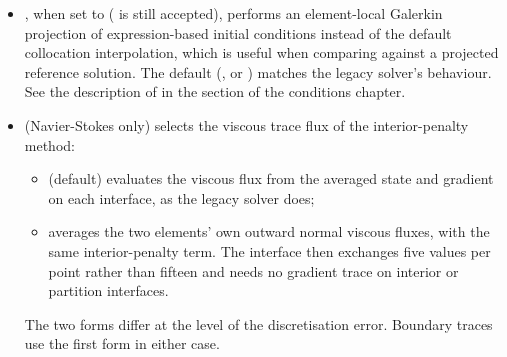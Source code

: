 \begin{itemize}
\begin{lstlisting}[style=XmlStyle]
<OPTIMISATION>
  <OPERATORS>
    <AVXBACKEND>
      <MASS> StdMat </MASS>
    </AVXBACKEND>
  </OPERATORS>
</OPTIMISATION>
\end{lstlisting}
  where ,  and
   sections each list operators by name with their
  implementation. Anything still unspecified defaults to 
  with a warning.
\item {}, when set to 
  ( is still accepted), performs an element-local Galerkin
  projection of expression-based initial conditions instead of the
  default collocation interpolation, which is useful when comparing
  against a projected reference solution. The default (,
  or ) matches the legacy solver's behaviour. See the
  description of  in the
   section of the conditions chapter.
\item {} (Navier-Stokes only) selects the viscous
  trace flux of the interior-penalty method:
  \begin{itemize}
  \item {} (default) evaluates the viscous flux from the
    averaged state and gradient on each interface, as the legacy solver
    does;
  \item {} averages the two elements' own
    outward normal viscous fluxes, with the same interior-penalty term.
    The interface then exchanges five values per point rather than
    fifteen and needs no gradient trace on interior or partition
    interfaces.
  \end{itemize}
  The two forms differ at the level of the discretisation error.
  Boundary traces use the first form in either case.
\end{itemize}

